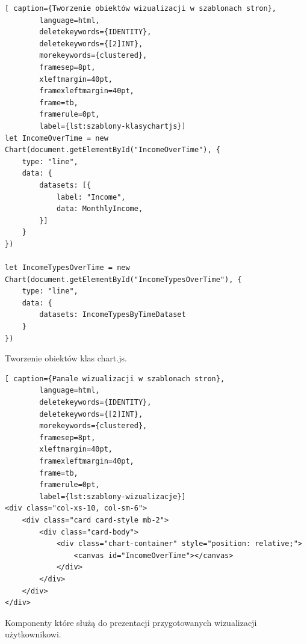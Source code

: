 \documentclass[a4paper,10pt, twoside]{report}
\begin{document}
\begin{large}
\begin{minipage}{\textwidth}
    \begin{lstlisting}[ caption={Tworzenie obiektów wizualizacji w szablonach stron},
        language=html,
        deletekeywords={IDENTITY},
        deletekeywords={[2]INT},
        morekeywords={clustered},
        framesep=8pt,
        xleftmargin=40pt,
        framexleftmargin=40pt,
        frame=tb,
        framerule=0pt,
        label={lst:szablony-klasychartjs}]
let IncomeOverTime = new Chart(document.getElementById("IncomeOverTime"), {
    type: "line",
    data: {
        datasets: [{
            label: "Income",
            data: MonthlyIncome,
        }]
    }
})

let IncomeTypesOverTime = new Chart(document.getElementById("IncomeTypesOverTime"), {
    type: "line",
    data: {
        datasets: IncomeTypesByTimeDataset
    }
})\end{lstlisting}
\end{minipage}
{Tworzenie obiektów klas chart.js.}

\begin{minipage}{\textwidth}
    \begin{lstlisting}[ caption={Panale wizualizacji w szablonach stron},
        language=html,
        deletekeywords={IDENTITY},
        deletekeywords={[2]INT},
        morekeywords={clustered},
        framesep=8pt,
        xleftmargin=40pt,
        framexleftmargin=40pt,
        frame=tb,
        framerule=0pt,
        label={lst:szablony-wizualizacje}]
<div class="col-xs-10, col-sm-6">
    <div class="card card-style mb-2">
        <div class="card-body">
            <div class="chart-container" style="position: relative;">
                <canvas id="IncomeOverTime"></canvas>
            </div>
        </div>
    </div>
</div>\end{lstlisting}
\end{minipage}
{Komponenty które służą do prezentacji przygotowanych wizualizacji 
użytkownikowi.}



\end{large}
\end{document}
